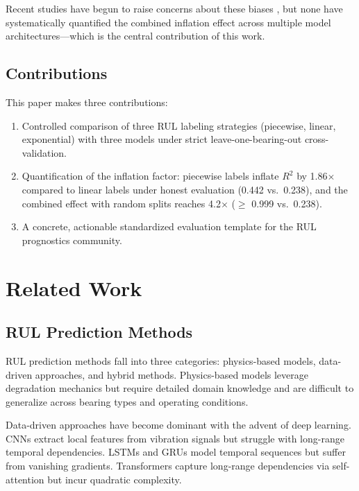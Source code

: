 \documentclass[5p,twocolumn]{elsarticle}
\begin{document}
Recent studies have begun to raise concerns about these biases \cite{zhao2021deep, caesarendra2021machine}, but none have systematically quantified the combined inflation effect across multiple model architectures---which is the central contribution of this work.

\subsection{Contributions}

This paper makes three contributions:

\begin{enumerate}
    \item Controlled comparison of three RUL labeling strategies (piecewise, linear, exponential) with three models under strict leave-one-bearing-out cross-validation.
    \item Quantification of the inflation factor: piecewise labels inflate $R^2$ by 1.86$\times$ compared to linear labels under honest evaluation (0.442 vs.\ 0.238), and the combined effect with random splits reaches 4.2$\times$ ($\geq$ 0.999 vs.\ 0.238).
    \item A concrete, actionable standardized evaluation template for the RUL prognostics community.
\end{enumerate}


\section{Related Work}
\label{sec:related}

\subsection{RUL Prediction Methods}

RUL prediction methods fall into three categories: physics-based models, data-driven approaches, and hybrid methods. Physics-based models \cite{paris1963critical, kotzalas2004fatigue} leverage degradation mechanics but require detailed domain knowledge and are difficult to generalize across bearing types and operating conditions.

Data-driven approaches have become dominant with the advent of deep learning. CNNs \cite{li2020multiscale, ince2016real} extract local features from vibration signals but struggle with long-range temporal dependencies. LSTMs and GRUs \cite{zhang2020lstm, chen2021gru} model temporal sequences but suffer from vanishing gradients. Transformers \cite{mo2022transformer, vaswani2017attention} capture long-range dependencies via self-attention but incur quadratic complexity.
\end{document}
